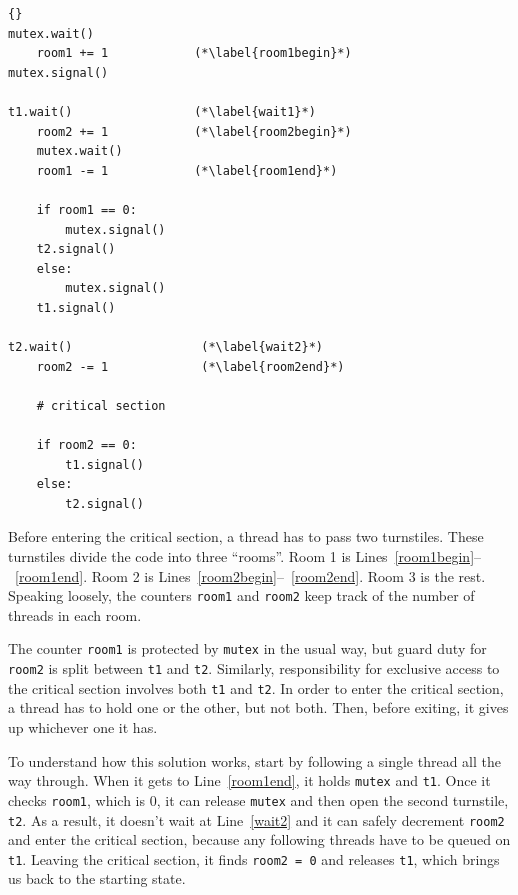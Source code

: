 \documentclass{book}
\begin{document}
\begin{latin}
\begin{latin}
\begin{lstlisting}[title={Morris's algorithm}]{}
mutex.wait()
    room1 += 1            (*\label{room1begin}*)
mutex.signal()
                           
t1.wait()                 (*\label{wait1}*)
    room2 += 1            (*\label{room2begin}*)
    mutex.wait()
    room1 -= 1            (*\label{room1end}*)

    if room1 == 0: 
        mutex.signal()
	t2.signal()
    else: 
        mutex.signal()
	t1.signal()

t2.wait()                  (*\label{wait2}*)
    room2 -= 1             (*\label{room2end}*)

    # critical section

    if room2 == 0:
        t1.signal()
    else:
        t2.signal()
\end{lstlisting}
\end{latin}
\end{latin}

Before entering the critical section, a thread has to pass two
turnstiles.  These turnstiles divide the code into three ``rooms''.
Room 1 is Lines~\ref{room1begin}--~\ref{room1end}.  Room 2 is
Lines~\ref{room2begin}--~\ref{room2end}.  Room 3 is the rest.
Speaking loosely, the counters {\tt room1} and {\tt room2} keep track
of the number of threads in each room.

The counter {\tt room1} is protected by {\tt mutex} in the usual way,
but guard duty for {\tt room2} is split between {\tt t1} and {\tt t2}.
Similarly, responsibility for exclusive access to the critical section
involves both {\tt t1} and {\tt t2}.  In order to enter the critical
section, a thread has to hold one or the other, but not both.  Then,
before exiting, it gives up whichever one it has.

To understand how this solution works, start by following a single
thread all the way through.  When it gets to Line~\ref{room1end}, it
holds {\tt mutex} and {\tt t1}.  Once it checks {\tt room1}, which is
0, it can release {\tt mutex} and then open the second turnstile, {\tt
t2}.  As a result, it doesn't wait at Line~\ref{wait2} and it can
safely decrement {\tt room2} and enter the critical section, because
any following threads have to be queued on {\tt t1}.  Leaving the
critical section, it finds {\tt room2 = 0} and releases {\tt t1},
which brings us back to the starting state.
\end{document}
